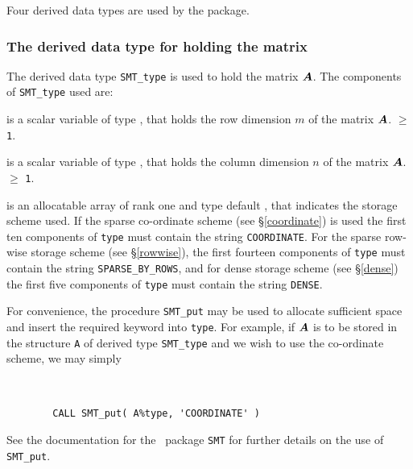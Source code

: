 \documentclass{galahad}
\begin{document}




\galtypes
Four derived data types are used by the package.


\subsubsection{The derived data type for holding the matrix}\label{typeprob}
The derived data type {\tt SMT\_type} is used to hold the matrix ${\bm{A}}$.
The components of {\tt SMT\_type} used are:

\begin{description}

 is a scalar variable of type \integer, that holds
the row dimension $m$ of the matrix  ${\bm{A}}$.
 $\geq$ {\tt 1}.

 is a scalar variable of type \integer, that holds
the column dimension $n$ of the matrix  ${\bm{A}}$.
 $\geq$ {\tt 1}.

 is an allocatable array of rank one and type default \character, that
indicates the storage scheme used. If the
sparse co-ordinate scheme (see \S\ref{coordinate}) is used
the first ten components of {\tt type} must contain the
string {\tt COORDINATE}.
For the sparse row-wise storage scheme (see \S\ref{rowwise}),
the first fourteen components of {\tt type} must contain the
string {\tt SPARSE\_BY\_ROWS}, and
for dense storage scheme (see \S\ref{dense})
the first five components of {\tt type} must contain the
string {\tt DENSE}.

For convenience, the procedure {\tt SMT\_put}
may be used to allocate sufficient space and insert the required keyword
into {\tt type}.
For example, if ${\bm{A}}$ is to be stored in the structure {\tt A}
of derived type {\tt SMT\_type} and we wish to use
the co-ordinate scheme, we may simply
{\tt
\begin{verbatim}
        CALL SMT_put( A%type, 'COORDINATE' )
\end{verbatim}
}
\noindent
See the documentation for the \galahad\ package {\tt SMT}
for further details on the use of {\tt SMT\_put}.


\end{description}
\end{document}
